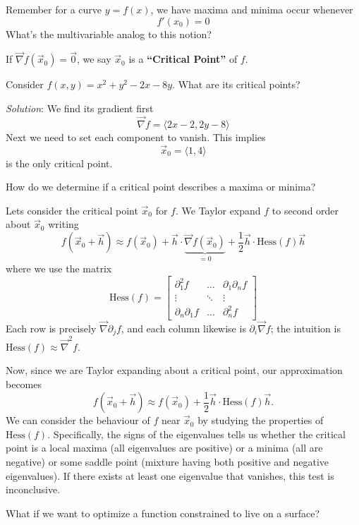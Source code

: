 
\M
Remember for a curve $y=f(x)$, we have maxima and minima occur
whenever
\begin{equation}
f'(x_{0}) = 0
\end{equation}
What's the multivariable analog to this notion? \more

If $\vec{\nabla}f(\vec{x}_{0})=\vec{0}$, we say $\vec{x}_{0}$ is
a \textbf{``Critical Point''} of $f$.

\begin{example}
Consider $f(x,y) = x^{2}+y^{2} - 2x - 8y$. What are its critical
points?

\emph{Solution}: We find its gradient first
\begin{equation}
\vec{\nabla}f = \langle 2x - 2, 2y - 8\rangle
\end{equation}
Next we need to set each component to vanish. This implies
\begin{equation}
\vec{x}_{0} = \langle 1, 4\rangle
\end{equation}
is the only critical point.
\end{example}

 How do we determine if a critical point describes a
maxima or minima?

Lets consider the critical point $\vec{x}_{0}$ for $f$. We Taylor
expand $f$ to second order about $\vec{x}_{0}$ writing
\begin{equation}
f(\vec{x}_{0}+\vec{h}) \approx f(\vec{x}_{0}) +
\vec{h}\cdot\underbrace{\vec{\nabla}f(\vec{x}_{0})}_{=0} + \frac{1}{2} \vec{h}\cdot\mathrm{Hess}(f)\vec{h}
\end{equation}
where we use the matrix
\begin{equation}
\mathrm{Hess}(f) = \begin{bmatrix}
\partial_{1}^{2} f & \dots & \partial_{1}\partial_{n}f \\
 \vdots  & \ddots & \vdots \\
\partial_{n}\partial_{1} f & \dots & \partial_{n}^{2}f
\end{bmatrix}
\end{equation}
Each row is precisely $\vec{\nabla}\partial_{j}f$, and each
column likewise is $\partial_{i}\vec{\nabla}f$; the intuition is
$\mathrm{Hess}(f) \approx \vec{\nabla}^{2}f$. 

Now, since we are Taylor expanding about a critical point, our
approximation becomes
\begin{equation}
f(\vec{x}_{0}+\vec{h}) \approx f(\vec{x}_{0}) +
\frac{1}{2} \vec{h}\cdot\mathrm{Hess}(f)\vec{h}.
\end{equation}
We can consider the behaviour of $f$ near $\vec{x}_{0}$ by
studying the properties of $\mathrm{Hess}(f)$. Specifically, the
signs of the eigenvalues tells us whether the critical point is a
local maxima (all eigenvalues are positive) or a minima (all are
negative) or some saddle point (mixture having both positive and
negative eigenvalues). If there exists at least one eigenvalue
that vanishes, this test is inconclusive.

 What if we want to optimize a function
constrained to live on a surface? 

